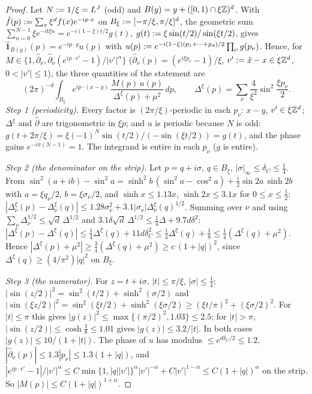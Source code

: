 \begin{proof}
Let $N:=1/\xi=L^J$ (odd) and $B(y)=y+([0,1)\cap\xi\mathbb Z)^d$. With $\hat f(p):=\sum_x\xi^df(x)e^{-ip\cdot x}$ on $B_\xi:=[-\pi/\xi,\pi/\xi]^d$, the geometric sum $\sum_{n=0}^{N-1}\xi e^{-it\xi n}=e^{-i(1-\xi)t/2}g(t)$, $g(t):=\xi\sin(t/2)/\sin(\xi t/2)$, gives $\hat{\mathbf 1}_{B(y)}(p)=e^{-ip\cdot y}u(p)$ with $u(p):= e^{-i(1-\xi)(p_1+\dots+p_d)/2}\prod_\nu g(p_\nu)$. Hence, for $M\in\{1,\hat\partial_\nu,\hat\partial_\nu(e^{ip\cdot v'}-1)/|v'|^\alpha\}$ ($\hat\partial_\nu(p)=(e^{i\xi p_\nu}-1)/\xi$, $v':=\tilde x-x\in\xi\mathbb Z^d$, $0<|v'|\le1$), the three quantities of the statement are
\[
(2\pi)^{-d}\int_{B_\xi}e^{ip\cdot(x-y)}\,\frac{M(p)\,u(p)}{\Delta^\xi(p)+\mu^2}\,dp,\qquad \Delta^\xi(p)=\sum_\nu\frac4{\xi^2}\sin^2\frac{\xi p_\nu}2.
\]
\emph{Step 1 (periodicity).} Every factor is $(2\pi/\xi)$-periodic in each $p_\nu$: $x-y$, $v'\in\xi\mathbb Z^d$; $\Delta^\xi$ and $\hat\partial$ are trigonometric in $\xi p$; and $u$ is periodic because $N$ is odd: $g(t+2\pi/\xi)=\xi(-1)^N\sin(t/2)/(-\sin(\xi t/2))=g(t)$, and the phase gains $e^{-i\pi(N-1)}=1$. The integrand is entire in each $p_\nu$ ($g$ is entire).

\emph{Step 2 (the denominator on the strip).} Let $p=q+i\sigma$, $q\in B_\xi$, $|\sigma|_\infty\le\delta_C\le\frac14$. From $\sin^2(a+ib)-\sin^2a=\sinh^2b\,(\sin^2a-\cos^2a)+\frac i2\sin2a\,\sinh2b$ with $a=\xi q_\nu/2$, $b=\xi\sigma_\nu/2$, and $\sinh x\le1.13x$, $\sinh2x\le3.1x$ for $0\le x\le\frac12$: $|\Delta^\xi_\nu(p)-\Delta^\xi_\nu(q)|\le1.28\sigma_\nu^2+3.1|\sigma_\nu|\Delta^\xi_\nu(q)^{1/2}$. Summing over $\nu$ and using $\sum_\nu\Delta_\nu^{1/2}\le\sqrt d\,\Delta^{1/2}$ and $3.1\delta\sqrt d\,\Delta^{1/2}\le\frac14\Delta+9.7d\delta^2$: $|\Delta^\xi(p)-\Delta^\xi(q)|\le\frac14\Delta^\xi(q)+11d\delta_C^2\le\frac14\Delta^\xi(q)+\frac18\le\frac14(\Delta^\xi(q)+\mu^2)$. Hence $|\Delta^\xi(p)+\mu^2|\ge\frac34(\Delta^\xi(q)+\mu^2)\ge c\,(1+|q|)^2$, since $\Delta^\xi(q)\ge(4/\pi^2)|q|^2$ on $B_\xi$.

\emph{Step 3 (the numerator).} For $z=t+i\sigma$, $|t|\le\pi/\xi$, $|\sigma|\le\frac14$: $|\sin(z/2)|^2=\sin^2(t/2)+\sinh^2(\sigma/2)$ and $|\sin(\xi z/2)|^2=\sin^2(\xi t/2)+\sinh^2(\xi\sigma/2)\ge(\xi t/\pi)^2+(\xi\sigma/2)^2$. For $|t|\le\pi$ this gives $|g(z)|^2\le\max\{(\pi/2)^2,1.03\}\le2.5$; for $|t|>\pi$, $|\sin(z/2)|\le\cosh\frac18\le1.01$ gives $|g(z)|\le3.2/|t|$. In both cases $|g(z)|\le10/(1+|t|)$. The phase of $u$ has modulus $\le e^{d\delta_C/2}\le1.2$, $|\hat\partial_\nu(p)|\le1.3|p_\nu|\le1.3(1+|q|)$, and $|e^{ip\cdot v'}-1|/|v'|^\alpha\le C\min\{1,|q||v'|\}^\alpha|v'|^{-\alpha}+C|v'|^{1-\alpha}\le C(1+|q|)^\alpha$ on the strip. So $|M(p)|\le C(1+|q|)^{1+\alpha}$.


\end{proof}
